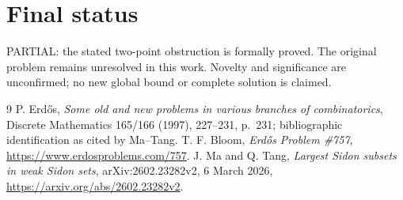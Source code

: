 \documentclass[11pt]{article}
\begin{document}
\section{Final status}
PARTIAL: the stated two-point obstruction is formally proved. The original
problem remains unresolved in this work. Novelty and significance are
unconfirmed; no new global bound or complete solution is claimed.

\begin{thebibliography}{9}
 P. Erd\H{o}s, \emph{Some old and new problems in various
branches of combinatorics}, Discrete Mathematics 165/166 (1997), 227--231,
p.~231; bibliographic identification as cited by Ma--Tang.
 T. F. Bloom, \emph{Erd\H{o}s Problem \#757},
\url{https://www.erdosproblems.com/757}.
 J. Ma and Q. Tang, \emph{Largest Sidon subsets in weak
Sidon sets}, arXiv:2602.23282v2, 6 March 2026,
\url{https://arxiv.org/abs/2602.23282v2}.
\end{thebibliography}
\end{document}
